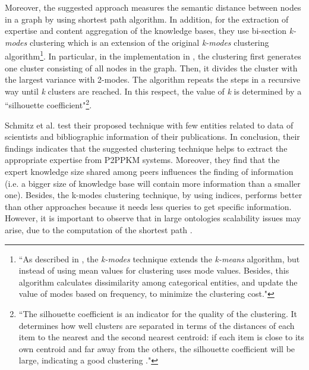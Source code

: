 \documentclass[runningheads]{llncs}
\begin{document}
Moreover, the suggested approach measures the semantic distance between nodes in a graph by using shortest path algorithm. In addition, for the extraction of expertise and content aggregation of the knowledge bases, they use bi-section {\textit{k-modes}} clustering which is an extension of the original {\textit{k-modes}} clustering algorithm\footnote{``As described in \cite{Huang}, the {\textit{k-modes}} technique extends the {\textit{k-means}} algorithm, but instead of using mean values for clustering uses mode values. Besides, this algorithm calculates dissimilarity among categorical entities, and update the value of modes based on frequency, to minimize the clustering cost."}. In particular, in the implementation in \cite{Schmitz}, the clustering first generates one cluster consisting of all nodes in the graph. Then, it divides the cluster with the largest variance with 2-modes. The algorithm repeats the steps in a recursive way until {\textit{k}} clusters are reached. In this respect, the value of {\textit{k}} is determined by a ``silhouette coefficient"\footnote{``The silhouette coefficient is an indicator for the quality of the clustering. It determines how well clusters are separated in terms of the distances of each item to the nearest and the second nearest centroid: if each item is close to its own centroid and far away from the others, the silhouette coefficient will be large, indicating a good clustering \cite{Schmitz}."}.

Schmitz et al. \cite{Schmitz} test their proposed technique with few entities related to data of scientists and bibliographic information of their publications. In conclusion, their findings indicates that the suggested clustering technique helps to extract the appropriate expertise from P2PPKM systems. Moreover, they find that the expert knowledge size shared among peers influences the finding of information (i.e. a bigger size of knowledge base will contain more information than a smaller one). Besides, the k-modes clustering technique, by using indices, performs better than other approaches because it needs less queries to get specific information. 
However, it is important to observe that in large ontologies scalability issues may arise, due to the computation of the shortest path \cite{Schmitz}.
\end{document}
